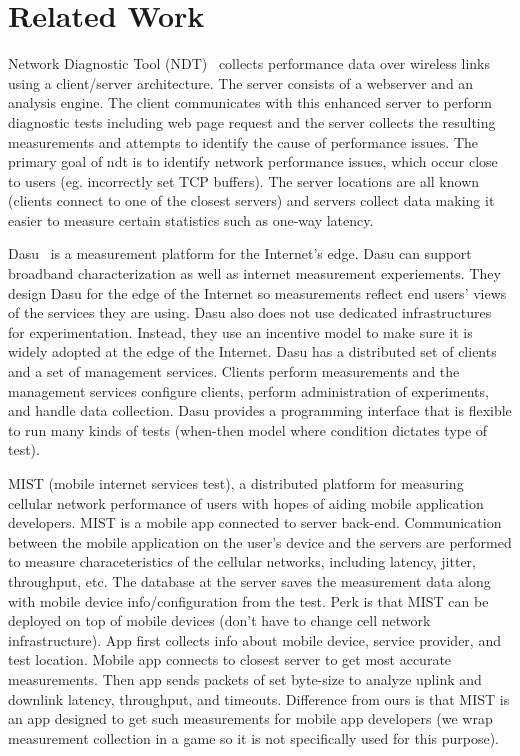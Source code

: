 \section{Related Work}
\label{s:related}


Network Diagnostic Tool (NDT)~\cite{NDT} collects performance data over wireless links using a client/server architecture. The server consists of a webserver and an analysis engine. The client communicates with this enhanced server to perform diagnostic tests including web page request and the server collects the resulting measurements and attempts to identify the cause of performance issues. The primary goal of ndt is to identify network performance issues, which occur close to users (eg. incorrectly set TCP buffers). The server locations are all known (clients connect to one of the closest servers) and servers collect data making it easier to measure certain statistics such as one-way latency.


Dasu~\cite{dasu-sanchez} is a measurement platform for the Internet's edge. Dasu can support broadband characterization as well as internet measurement experiements. They design Dasu for the edge of the Internet so measurements reflect end users' views of the services they are using. Dasu also does not use dedicated infrastructures for experimentation. Instead, they use an incentive model to make sure it is widely adopted at the edge of the Internet. Dasu has a distributed set of clients and a set of management services. Clients perform measurements and the management services configure clients,  perform administration of experiments, and handle data collection. Dasu provides a programming interface that is flexible to run many kinds of tests (when-then model where condition dictates type of test). 

MIST (mobile internet services test), a distributed platform for measuring cellular network performance of users with hopes of aiding mobile application developers. MIST is a mobile app connected to server back-end. Communication between the mobile application on the user's device and the servers are performed to measure characeteristics of the cellular networks, including latency, jitter, throughput, etc. The database at the server saves the measurement data along with mobile device info/configuration from the test. Perk is that MIST can be deployed on top of mobile devices (don't have to change cell network infrastructure). App first collects info about mobile device, service provider, and test location. Mobile app connects to closest server to get most accurate measurements. Then app sends packets of set byte-size to analyze uplink and downlink latency, throughput, and timeouts. Difference from ours is that MIST is an app designed to get such measurements for mobile app developers (we wrap measurement collection in a game so it is not specifically used for this purpose). 

